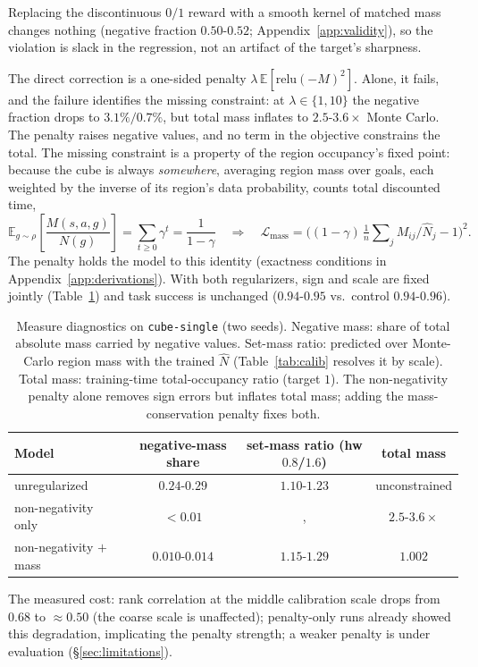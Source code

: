 \documentclass{article}
\newcommand{\E}{\mathbb{E}}
\newcommand{\Nhat}{\hat N}
\begin{document}
Replacing the discontinuous $0/1$ reward with a smooth kernel of matched mass changes nothing (negative fraction $0.50$-$0.52$; Appendix~\ref{app:validity}), so the violation is slack in the regression, not an artifact of the target's sharpness.

The direct correction is a one-sided penalty $\lambda\,\E[\mathrm{relu}(-M)^2]$.
Alone, it fails, and the failure identifies the missing constraint: at $\lambda\in\{1,10\}$ the negative fraction drops to $3.1\%/0.7\%$, but total mass inflates to $2.5$-$3.6\times$ Monte Carlo.
The penalty raises negative values, and no term in the objective constrains the total.
The missing constraint is a property of the region occupancy's fixed point: because the cube is always \emph{somewhere}, averaging region mass over goals, each weighted by the inverse of its region's data probability, counts total discounted time,
\begin{equation}
\label{eq:mass-anchor}
\E_{g\sim\rho}\!\left[\frac{M(s,a,g)}{N(g)}\right]=\sum_{t\ge0}\gamma^t =\frac{1}{1-\gamma} \quad\Longrightarrow\quad \mathcal{L}_{\mathrm{mass}} = \Big((1-\gamma)\,\tfrac{1}{n}\sum\nolimits_j M_{ij}/\Nhat_j-1\Big)^{2}.
\end{equation}
The penalty holds the model to this identity (exactness conditions in Appendix~\ref{app:derivations}).
With both regularizers, sign and scale are fixed jointly (Table~\ref{tab:measure}) and task success is unchanged ($0.94$-$0.95$ vs.\ control $0.94$-$0.96$).

\begin{table}[t]
\centering\small
\begin{tabular}{l ccc}
\toprule
Model & negative-mass share & set-mass ratio (hw $0.8$/$1.6$) & total mass \\
\midrule
unregularized               & $0.24$-$0.29$ & $1.10$-$1.23$ & unconstrained \\
non-negativity only        & $<0.01$        & ,             & $2.5$-$3.6\times$ \\
non-negativity $+$ mass    & $0.010$-$0.014$ & $1.15$-$1.29$ & $1.002$ \\
\bottomrule
\end{tabular}
\caption{Measure diagnostics on \texttt{cube-single} (two seeds).
Negative mass: share of total absolute mass carried by negative values.
Set-mass ratio: predicted over Monte-Carlo region mass with the trained $\Nhat$ (Table~\ref{tab:calib} resolves it by scale).
Total mass: training-time total-occupancy ratio (target $1$).
The non-negativity penalty alone removes sign errors but inflates total mass; adding the mass-conservation penalty fixes both.}
\label{tab:measure}
\end{table}
The measured cost: rank correlation at the middle calibration scale drops from $0.68$ to $\approx0.50$ (the coarse scale is unaffected); penalty-only runs already showed this degradation, implicating the penalty strength; a weaker penalty is under evaluation (\S\ref{sec:limitations}).
\end{document}
